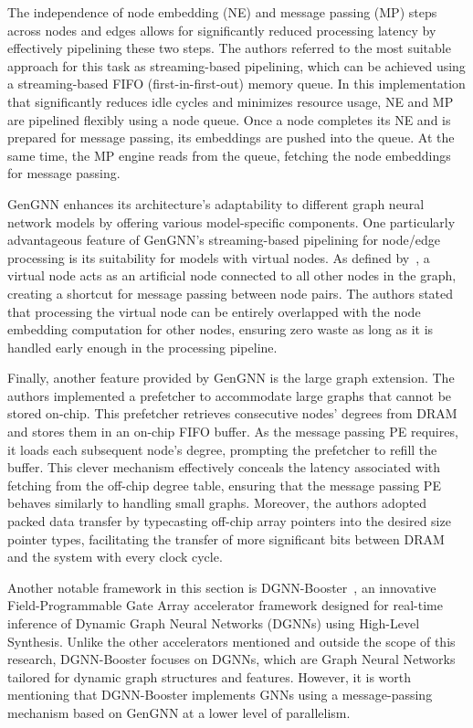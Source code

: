 The independence of node embedding (NE) and message passing (MP) steps across nodes and edges allows for significantly reduced processing latency by effectively pipelining these two steps.
The authors referred to the most suitable approach for this task as streaming-based pipelining, which can be achieved using a streaming-based FIFO (first-in-first-out) memory queue.
In this implementation that significantly reduces idle cycles and minimizes resource usage, NE and MP are pipelined flexibly using a node queue.
Once a node completes its NE and is prepared for message passing, its embeddings are pushed into the queue.
At the same time, the MP engine reads from the queue, fetching the node embeddings for message passing.

GenGNN enhances its architecture's adaptability to different graph neural network models by offering various model-specific components.
One particularly advantageous feature of GenGNN's streaming-based pipelining for node/edge processing is its suitability for models with virtual nodes.
As defined by~\cite{DBLP:journals/corr/GilmerSRVD17}, a virtual node acts as an artificial node connected to all other nodes in the graph, creating a shortcut for message passing between node pairs.
The authors stated that processing the virtual node can be entirely overlapped with the node embedding computation for other nodes, ensuring zero waste as long as it is handled early enough in the processing pipeline.

Finally, another feature provided by GenGNN is the large graph extension.
The authors implemented a prefetcher to accommodate large graphs that cannot be stored on-chip.
This prefetcher retrieves consecutive nodes' degrees from DRAM and stores them in an on-chip FIFO buffer.
As the message passing PE requires, it loads each subsequent node's degree, prompting the prefetcher to refill the buffer.
This clever mechanism effectively conceals the latency associated with fetching from the off-chip degree table, ensuring that the message passing PE behaves similarly to handling small graphs.
Moreover, the authors adopted packed data transfer by typecasting off-chip array pointers into the desired size pointer types, facilitating the transfer of more significant bits between DRAM and the system with every clock cycle.

Another notable framework in this section is DGNN-Booster~\cite{chen2023dgnnbooster}, an innovative Field-Programmable Gate Array accelerator framework designed for real-time inference of Dynamic Graph Neural Networks (DGNNs) using High-Level Synthesis.
Unlike the other accelerators mentioned and outside the scope of this research, DGNN-Booster focuses on DGNNs, which are Graph Neural Networks tailored for dynamic graph structures and features.
However, it is worth mentioning that DGNN-Booster implements GNNs using a message-passing mechanism based on GenGNN at a lower level of parallelism.

